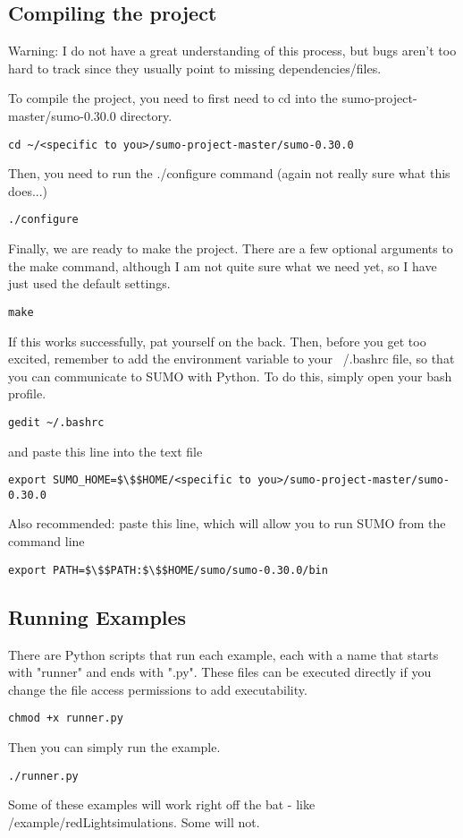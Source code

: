 \documentclass{article}
\begin{document}
\subsection{Compiling the project}
Warning: I do not have a great understanding of this process, but bugs aren't too hard to track since they usually point to missing dependencies/files. 

To compile the project, you need to first need to cd into the sumo-project-master/sumo-0.30.0 directory.
\begin{lstlisting}
cd ~/<specific to you>/sumo-project-master/sumo-0.30.0
\end{lstlisting}
Then, you need to run the ./configure command (again not really sure what this does...)
\begin{lstlisting}
./configure
\end{lstlisting}
Finally, we are ready to make the project. There are a few optional arguments to the make command, although I am not quite sure what we need yet, so I have just used the default settings.
\begin{lstlisting}
make
\end{lstlisting}

If this works successfully, pat yourself on the back. Then, before you get too excited, remember to add the environment variable to your ~/.bashrc file, so that you can communicate to SUMO with Python. To do this, simply open your bash profile. 
\begin{lstlisting}
gedit ~/.bashrc
\end{lstlisting}
and paste this line into the text file
\begin{lstlisting}
export SUMO_HOME=$\$$HOME/<specific to you>/sumo-project-master/sumo-0.30.0
\end{lstlisting}
Also recommended: paste this line, which will allow you to run SUMO from the command line
\begin{lstlisting}
export PATH=$\$$PATH:$\$$HOME/sumo/sumo-0.30.0/bin
\end{lstlisting}

\subsection{Running Examples}
There are Python scripts that run each example, each with a name that starts with "runner" and ends with ".py". These files can be executed directly if you change the file access permissions to add executability.
\begin{lstlisting}
chmod +x runner.py
\end{lstlisting}
Then you can simply run the example. 
\begin{lstlisting}
./runner.py
\end{lstlisting}
Some of these examples will work right off the bat - like /example/redLight\textunderscore simulations. Some will not. 
\end{document}
